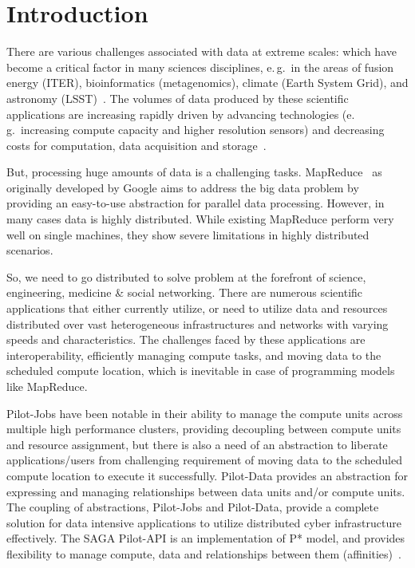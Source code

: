 \documentclass{acm_proc_article-sp}
\begin{document}


\section{Introduction}

There are various challenges associated with data at extreme scales: which
have become a critical factor in many sciences disciplines, e.\,g.\ in the
areas of fusion energy (ITER), bioinformatics (metagenomics), climate (Earth
System Grid), and astronomy
(LSST)~\cite{Berriman:2011:AAS:2039359.2047483,Jha:2011fk}. The volumes of
data produced by these scientific applications are increasing rapidly driven
by advancing technologies (e.\,g.\ increasing compute capacity and higher
resolution sensors) and decreasing costs for computation, data acquisition and
storage~\cite{hey2009}.

But, processing huge amounts of data is a challenging tasks.
MapReduce~\cite{Dean:2004:MSD:1251254.1251264} as originally developed by
Google aims to address the big data problem by providing an easy-to-use
abstraction for parallel data processing. However, in many cases data is
highly distributed. While existing MapReduce perform very well on single
machines, they show severe limitations in highly distributed scenarios.

So, we need to go distributed to solve problem at the
forefront of science, engineering, medicine \& social networking. There are
numerous scientific applications that either currently utilize, or need to
utilize data and resources distributed over vast heterogeneous infrastructures
and networks with varying speeds and characteristics. The challenges faced by
these applications are interoperability, efficiently managing compute tasks,
and moving data to the scheduled compute location, which is inevitable in case
of programming models like MapReduce.

Pilot-Jobs have been notable in their ability to manage the compute units
across multiple high performance clusters, providing decoupling between
compute units and resource assignment, but there is also a need of an
abstraction to liberate applications/users from challenging requirement of
moving data to the scheduled compute location to execute it successfully.
Pilot-Data provides an abstraction for expressing and managing relationships
between data units and/or compute units. The coupling of abstractions,
Pilot-Jobs and Pilot-Data, provide a complete solution for data intensive
applications to utilize distributed cyber infrastructure effectively. The SAGA
Pilot-API is an implementation of P* model, and provides flexibility to manage
compute, data and relationships between them (affinities)~\cite{pstar-2012}.
\end{document}
